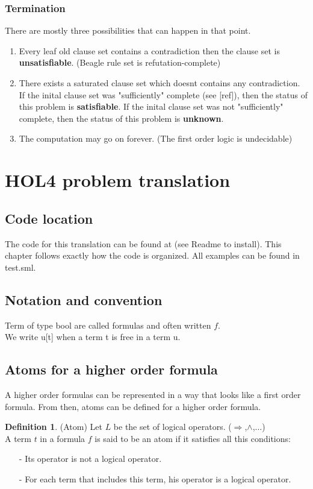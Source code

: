 \documentclass[a4paper, 11pt]{article}
\theoremstyle{plain}
\theoremstyle{definition}
\newtheorem*{mydef}{Definition}
\theoremstyle{remark}
\begin{document}
\subsubsection{Termination}

There are mostly three possibilities that can happen in that point.
\begin{enumerate}
\item Every leaf old clause set contains a contradiction then the clause set is \textbf{unsatisfiable}. (Beagle rule set is refutation-complete)
\item There exists a saturated clause set which doesnt contains any contradiction.
\subitem If the inital clause set was "sufficiently" complete (see [ref]), then the status of this problem is \textbf{satisfiable}.
\subitem If the inital clause set was not "sufficiently" complete, then the status of this problem is \textbf{unknown}.
\item The computation may go on forever. (The first order logic is undecidable)
\end{enumerate} 
 
\section{HOL4 problem translation}

\subsection{Code location}
  The code for this translation can be found at  (see Readme to install).
This chapter follows exactly how the code is organized. All examples can be found in test.sml.

\subsection{Notation and convention}
Term of type bool are called formulas and often written $f$.
\\We write u[t] when a term t is free in a term u. 

\subsection{Atoms for a higher order formula}
A higher order formulas can be represented in a way that looks like a first order formula. From then, atoms can be defined for a higher order formula.

\begin{mydef} (Atom)
Let $L$ be the set of logical operators. ($\Rightarrow$,$\wedge$,$\ldots$)
\\A term $t$ in a formula $f$ is said to be an atom if it satisfies all this conditions:
\begin{enumerate}
\item [-] Its operator is not a logical operator.
\item [-] For each term that includes this term, his operator is a logical operator. 
\end{enumerate}
\end{mydef}
\end{document}
